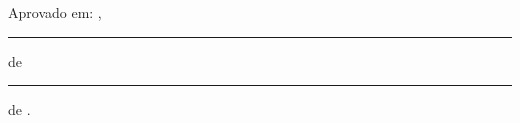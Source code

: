 \begin{folhadeaprovacao}
  \begin{center}
    {\ABNTEXchapterfont\large\imprimirautor}
    \vspace*{\fill}\vspace*{\fill}
    \begin{center}
      \ABNTEXchapterfont\bfseries\Large\imprimirtitulo
    \end{center}
    \vspace*{\fill}
    \hspace{.45\textwidth}
    \begin{minipage}{.5\textwidth}
      \imprimirpreambulo
    \end{minipage}%
    \vspace*{\fill}
    Aprovado em: \imprimirlocal, \rule{1cm}{1pt} de \rule{4cm}{1pt} de \imprimirdata.
  \end{center}
  \begin{center}
    \vspace*{0.5cm}
    \imprimirlocal
    \par
    \imprimirdata
  \end{center}
\end{folhadeaprovacao}
